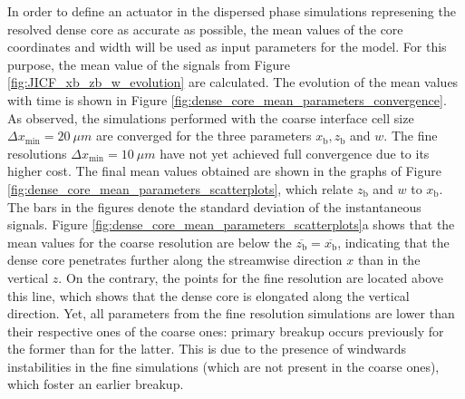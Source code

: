 In order to define an actuator in the dispersed phase simulations represening the resolved dense core as accurate as possible, the mean values of the core coordinates and width will be used as input parameters for the model. For this purpose, the mean value of the signals from Figure \ref{fig:JICF_xb_zb_w_evolution} are calculated. The evolution of the mean values with time is shown in Figure \ref{fig:dense_core_mean_parameters_convergence}. As observed, the simulations performed with the coarse interface cell size $\Delta x_\mathrm{min} = 20~\mu m$ are converged for the three parameters $x_\mathrm{b}, z_\mathrm{b}$ and $w$. The fine resolutions $\Delta x_\mathrm{min} = 10~\mu m$ have not yet achieved full convergence due to its higher cost. The final mean values obtained are shown in the graphs of Figure \ref{fig:dense_core_mean_parameters_scatterplots}, which relate $z_\mathrm{b}$ and $w$ to $x_\mathrm{b}$. The bars in the figures denote the standard deviation of the instantaneous signals. Figure \ref{fig:dense_core_mean_parameters_scatterplots}a shows that the mean values for the coarse resolution are below the $\overline{z_\mathrm{b}} = \overline{x_\mathrm{b}}$, indicating that the dense core penetrates further along the streamwise direction $x$ than in the vertical $z$. On the contrary, the points for the fine resolution are located above this line, which shows that the dense core is elongated along the vertical direction. Yet, all parameters from the fine resolution simulations are lower than their respective ones of the coarse ones: primary breakup occurs previously for the former than for the latter. This is due to the presence of windwards instabilities in the fine simulations (which are not present in the coarse ones), which foster an earlier breakup.

